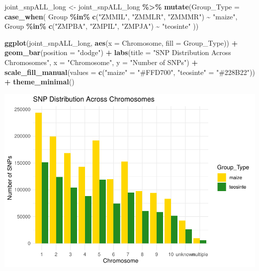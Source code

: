 \documentclass[
]{article}
\newenvironment{Shaded}{\begin{snugshade}}{\end{snugshade}}
\newcommand{\AttributeTok}[1]{\textcolor[rgb]{0.13,0.29,0.53}{#1}}
\newcommand{\FunctionTok}[1]{\textcolor[rgb]{0.13,0.29,0.53}{\textbf{#1}}}
\newcommand{\NormalTok}[1]{#1}
\newcommand{\OtherTok}[1]{\textcolor[rgb]{0.56,0.35,0.01}{#1}}
\newcommand{\SpecialCharTok}[1]{\textcolor[rgb]{0.81,0.36,0.00}{\textbf{#1}}}
\newcommand{\StringTok}[1]{\textcolor[rgb]{0.31,0.60,0.02}{#1}}
\begin{document}
\begin{Shaded}
\begin{Highlighting}[]
\NormalTok{joint\_snpALL\_long }\OtherTok{\textless{}{-}}\NormalTok{ joint\_snpALL\_long }\SpecialCharTok{\%\textgreater{}\%}
  \FunctionTok{mutate}\NormalTok{(}\AttributeTok{Group\_Type =} \FunctionTok{case\_when}\NormalTok{(}
\NormalTok{    Group }\SpecialCharTok{\%in\%} \FunctionTok{c}\NormalTok{(}\StringTok{"ZMMIL"}\NormalTok{, }\StringTok{"ZMMLR"}\NormalTok{, }\StringTok{"ZMMMR"}\NormalTok{) }\SpecialCharTok{\textasciitilde{}} \StringTok{"maize"}\NormalTok{,}
\NormalTok{    Group }\SpecialCharTok{\%in\%} \FunctionTok{c}\NormalTok{(}\StringTok{"ZMPBA"}\NormalTok{, }\StringTok{"ZMPIL"}\NormalTok{, }\StringTok{"ZMPJA"}\NormalTok{) }\SpecialCharTok{\textasciitilde{}} \StringTok{"teosinte"}
\NormalTok{  ))}

\FunctionTok{ggplot}\NormalTok{(joint\_snpALL\_long, }\FunctionTok{aes}\NormalTok{(}\AttributeTok{x =}\NormalTok{ Chromosome, }\AttributeTok{fill =}\NormalTok{ Group\_Type)) }\SpecialCharTok{+}
  \FunctionTok{geom\_bar}\NormalTok{(}\AttributeTok{position =} \StringTok{"dodge"}\NormalTok{) }\SpecialCharTok{+}
  \FunctionTok{labs}\NormalTok{(}\AttributeTok{title =} \StringTok{"SNP Distribution Across Chromosomes"}\NormalTok{,}
       \AttributeTok{x =} \StringTok{"Chromosome"}\NormalTok{, }\AttributeTok{y =} \StringTok{"Number of SNPs"}\NormalTok{) }\SpecialCharTok{+}
  \FunctionTok{scale\_fill\_manual}\NormalTok{(}\AttributeTok{values =} \FunctionTok{c}\NormalTok{(}\StringTok{"maize"} \OtherTok{=} \StringTok{"\#FFD700"}\NormalTok{, }\StringTok{"teosinte"} \OtherTok{=} \StringTok{"\#228B22"}\NormalTok{)) }\SpecialCharTok{+}
  \FunctionTok{theme\_minimal}\NormalTok{()}
\end{Highlighting}
\end{Shaded}

\includegraphics{R_Assignment_files/figure-latex/unnamed-chunk-11-1.pdf}
\end{document}
